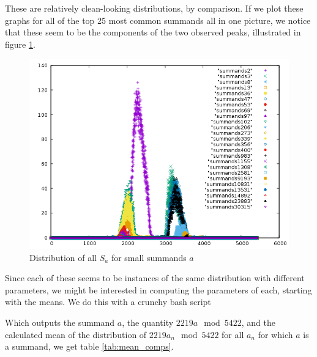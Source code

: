 \documentclass{report}
\theoremstyle{remark}
\numberwithin{equation}{section}
\begin{document}
These are relatively clean-looking distributions, by comparison.  If
we plot these graphs for all of the top 25 most common summands all in
one picture, we notice that these seem to be the components of the two
observed peaks, illustrated in figure \ref{fig:summands}.

\begin{figure}
\caption{Distribution of all $S_a$ for small summands $a$}\label{fig:summands}
\centering
\includegraphics[scale=0.5]{../figs/summands_mod_5422.png}
\end{figure}

Since each of these seems to be instances of the same distribution
with different parameters, we might be interested in computing the
parameters of each, starting with the means.  We do this with a crunchy bash script




Which outputs the summand $a$, the quantity $2219 a \mod {5422}$, and
the calculated mean of the distribution of $2219 a_n \mod{5422}$ for
all $a_n$ for which $a$ is a summand, we get table
\ref{tab:mean_comps}.
\end{document}
